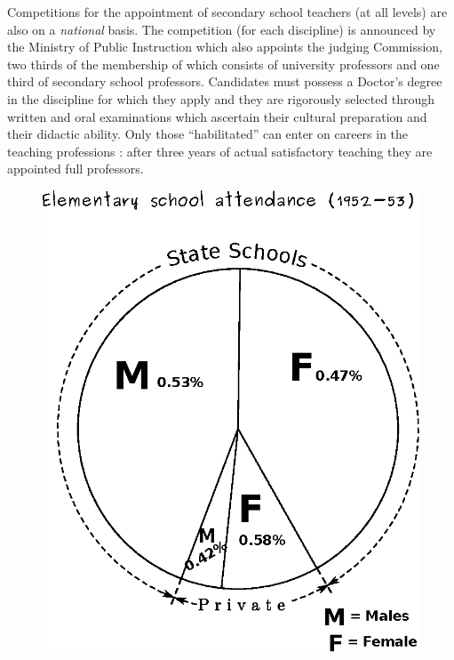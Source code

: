 Competitions for the appointment of secondary school teachers (at all levels) are also on a {\em national} basis. The competition (for each discipline) is announced by the Ministry of Public Instruction which also appoints the judging Commission, two thirds of the membership of which consists of university professors and one third of secondary school professors. Candidates must possess a Doctor's degree in the discipline for which they apply and they are rigorously selected through written and oral examinations which ascertain their cultural preparation and their didactic ability. Only those ``habilitated'' can enter on careers in the teaching professions : after three years of actual satisfactory teaching they are appointed full professors.
\begin{figure}[H]
\centering
\includegraphics[scale=.9]{figure/fig_38b.eps}
\end{figure}

\eject

~\phantom{a}

\vfill


